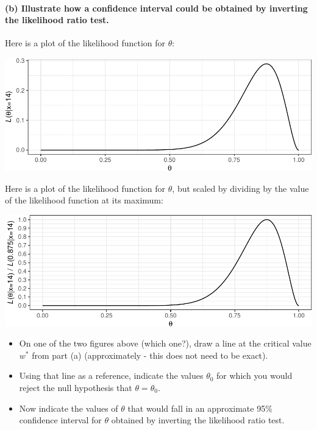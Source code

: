 \documentclass[]{article}
\providecommand{\tightlist}{%
  \setlength{\itemsep}{0pt}\setlength{\parskip}{0pt}}
\let\oldparagraph\paragraph
\renewcommand{\paragraph}[1]{\oldparagraph{#1}\mbox{}}
\begin{document}
\vspace{2cm}

\paragraph{(b) Illustrate how a confidence interval could be obtained by
inverting the likelihood ratio
test.}\label{b-illustrate-how-a-confidence-interval-could-be-obtained-by-inverting-the-likelihood-ratio-test.}

Here is a plot of the likelihood function for \(\theta\):

\includegraphics{20180419_LRT_CI_files/figure-latex/unnamed-chunk-3-1.pdf}

Here is a plot of the likelihood function for \(\theta\), but scaled by
dividing by the value of the likelihood function at its maximum:

\includegraphics{20180419_LRT_CI_files/figure-latex/unnamed-chunk-4-1.pdf}

\begin{itemize}
\tightlist
\item
  On one of the two figures above (which one?), draw a line at the
  critical value \(w^*\) from part (a) (approximately - this does not
  need to be exact).
\item
  Using that line as a reference, indicate the values \(\theta_0\) for
  which you would reject the null hypothesis that \(\theta = \theta_0\).
\item
  Now indicate the values of \(\theta\) that would fall in an
  approximate 95\% confidence interval for \(\theta\) obtained by
  inverting the likelihood ratio test.
\end{itemize}
\end{document}
